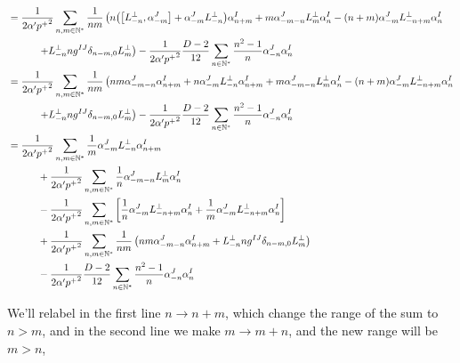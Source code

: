 \begin{align*}
    &=\frac{1}{2\alpha'{p^+}^2}\sum\limits_{n,m\in\mathbb N^\ast}\frac{1}{nm}\left(n\qty(\comm{L^\perp_{-n}}{\alpha^J_{-m}}+\alpha^J_{-m}L^\perp_{-n})\alpha^I_{n+m}+m\alpha^J_{-m-n}L^\perp_m\alpha_n^I-\qty(n+m)\alpha^J_{-m}L^\perp_{-n+m}\alpha_n^I\right.\\
    &\quad\quad\quad\left.+L^\perp_{-n}ng^{IJ}\delta_{n-m,0}L^\perp_m\right)-\frac{1}{2\alpha'{p^+}^2}\frac{D-2}{12}\sum\limits_{n\in\mathbb N^\ast}\frac{n^2-1}{n}\alpha^J_{-n}\alpha_n^I\\
    &=\frac{1}{2\alpha'{p^+}^2}\sum\limits_{n,m\in\mathbb N^\ast}\frac{1}{nm}\left(nm\alpha^J_{-m-n}\alpha^I_{n+m}+n\alpha^J_{-m}L^\perp_{-n}\alpha^I_{n+m}+m\alpha^J_{-m-n}L^\perp_m\alpha_n^I-\qty(n+m)\alpha^J_{-m}L^\perp_{-n+m}\alpha_n^I\right.\\
    &\quad\quad\quad\left.+L^\perp_{-n}ng^{IJ}\delta_{n-m,0}L^\perp_m\right)-\frac{1}{2\alpha'{p^+}^2}\frac{D-2}{12}\sum\limits_{n\in\mathbb N^\ast}\frac{n^2-1}{n}\alpha^J_{-n}\alpha_n^I\\
    &=\frac{1}{2\alpha'{p^+}^2}\sum\limits_{n,m\in\mathbb N^\ast}\frac{1}{m}\alpha^J_{-m}L^\perp_{-n}\alpha^I_{n+m}\\
    &\quad\quad\quad+\frac{1}{2\alpha'{p^+}^2}\sum\limits_{n,m\in\mathbb N^\ast}\frac{1}{n}\alpha^J_{-m-n}L^\perp_m\alpha_n^I\\
    &\quad\quad\quad-\frac{1}{2\alpha'{p^+}^2}\sum\limits_{n,m\in\mathbb N^\ast}\qty[\frac1n\alpha^J_{-m}L^\perp_{-n+m}\alpha_n^I+\frac1m\alpha^J_{-m}L^\perp_{-n+m}\alpha_n^I]\\
    &\quad\quad\quad+\frac{1}{2\alpha'{p^+}^2}\sum\limits_{n,m\in\mathbb N^\ast}\frac{1}{nm}\left(nm\alpha^J_{-m-n}\alpha^I_{n+m}+L^\perp_{-n}ng^{IJ}\delta_{n-m,0}L^\perp_m\right)\\
    &\quad\quad\quad-\frac{1}{2\alpha'{p^+}^2}\frac{D-2}{12}\sum\limits_{n\in\mathbb N^\ast}\frac{n^2-1}{n}\alpha^J_{-n}\alpha_n^I
\end{align*}

We'll relabel in the first line $n\rightarrow n+m$, which change the range of the sum to $n>m$, and in the second line we make $m\rightarrow m+n$, and the new 
range will be $m>n$,

